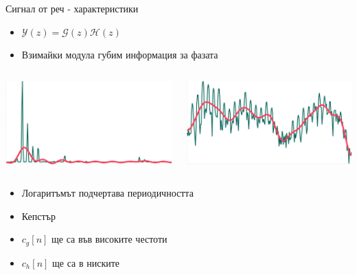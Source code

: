 \documentclass[9pt]{beamer}
\begin{document}
    \begin{frame}[t]{Сигнал от реч - характеристики}
        \begin{itemize}
            \setlength\itemsep{\fill}
            \pause
            \item $\mathcal{Y}(z) = \mathcal{G}(z)\mathcal{H}(z)$
            \pause 
            \item Взимайки модула губим информация за фазата
        \end{itemize}
        \pause
        \begin{columns}
            \begin{column}{0.48\textwidth}
                \includegraphics[width=\textwidth]{aaaa.png}
            \end{column}
            \pause
            \hfill
            \begin{column}{0.48\textwidth}
                \includegraphics[width=\textwidth]{aaaa_log.png}
            \end{column}
        \end{columns}
        \begin{itemize}
            \setlength\itemsep{\fill}
            \pause
            \item Логаритъмът подчертава периодичността
            \pause
            \item Кепстър
            \pause
            \item $c_g[n]$ ще са във високите честоти 
            \pause
            \item $c_h[n]$ ще са в ниските
        \end{itemize}
    \end{frame}
\end{document}
